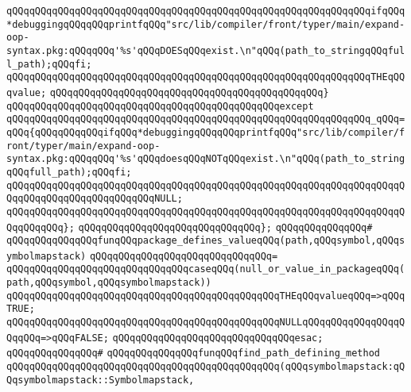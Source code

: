 \newline
\verb|qQQqqQQqqQQqqQQqqQQqqQQqqQQqqQQqqQQqqQQqqQQqqQQqqQQqqQQqqQQqqQQqifqQQq*debuggingqQQqqQQqprintfqQQq"src/lib/compiler/front/typer/main/expand-oop-syntax.pkg:qQQqqQQq'%s'qQQqDOESqQQqexist.\n"qQQq(path_to_stringqQQqfull_path);qQQqfi;|\newline
\newline
\verb|qQQqqQQqqQQqqQQqqQQqqQQqqQQqqQQqqQQqqQQqqQQqqQQqqQQqqQQqqQQqqQQqTHEqQQqvalue;|\newline
\verb|qQQqqQQqqQQqqQQqqQQqqQQqqQQqqQQqqQQqqQQqqQQqqQQq}|\newline
\verb|qQQqqQQqqQQqqQQqqQQqqQQqqQQqqQQqqQQqqQQqqQQqqQQqexcept|\newline
\verb|qQQqqQQqqQQqqQQqqQQqqQQqqQQqqQQqqQQqqQQqqQQqqQQqqQQqqQQqqQQqqQQq_qQQq=qQQq{qQQqqQQqqQQqifqQQq*debuggingqQQqqQQqprintfqQQq"src/lib/compiler/front/typer/main/expand-oop-syntax.pkg:qQQqqQQq'%s'qQQqdoesqQQqNOTqQQqexist.\n"qQQq(path_to_stringqQQqfull_path);qQQqfi;|\newline
\newline
\verb|qQQqqQQqqQQqqQQqqQQqqQQqqQQqqQQqqQQqqQQqqQQqqQQqqQQqqQQqqQQqqQQqqQQqqQQqqQQqqQQqqQQqqQQqqQQqqQQqNULL;|\newline
\verb|qQQqqQQqqQQqqQQqqQQqqQQqqQQqqQQqqQQqqQQqqQQqqQQqqQQqqQQqqQQqqQQqqQQqqQQqqQQqqQQq};|\newline
\verb|qQQqqQQqqQQqqQQqqQQqqQQqqQQqqQQq};|\newline
\newline
\verb|qQQqqQQqqQQqqQQq#|\newline
\verb|qQQqqQQqqQQqqQQqfunqQQqpackage_defines_valueqQQq(path,qQQqsymbol,qQQqsymbolmapstack)|\newline
\verb|qQQqqQQqqQQqqQQqqQQqqQQqqQQqqQQq=|\newline
\verb|qQQqqQQqqQQqqQQqqQQqqQQqqQQqqQQqcaseqQQq(null_or_value_in_packageqQQq(path,qQQqsymbol,qQQqsymbolmapstack))|\newline
\verb|qQQqqQQqqQQqqQQqqQQqqQQqqQQqqQQqqQQqqQQqqQQqqQQqTHEqQQqvalueqQQq=>qQQqTRUE;|\newline
\verb|qQQqqQQqqQQqqQQqqQQqqQQqqQQqqQQqqQQqqQQqqQQqqQQqNULLqQQqqQQqqQQqqQQqqQQqqQQq=>qQQqFALSE;|\newline
\verb|qQQqqQQqqQQqqQQqqQQqqQQqqQQqqQQqesac;|\newline
\newline
\verb|qQQqqQQqqQQqqQQq#|\newline
\verb|qQQqqQQqqQQqqQQqfunqQQqfind_path_defining_method|\newline
\verb|qQQqqQQqqQQqqQQqqQQqqQQqqQQqqQQqqQQqqQQqqQQqqQQq(qQQqsymbolmapstack:qQQqsymbolmapstack::Symbolmapstack,|\newline
